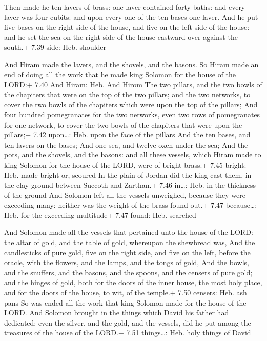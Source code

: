  Then made he ten lavers of brass: one laver contained
forty baths: and every laver was four cubits: and upon every one of the
ten bases one laver.  And he put five bases on the right
side of the house, and five on the left side of the house: and he set
the sea on the right side of the house eastward over against the south.+
7.39 side: Heb. shoulder

 And Hiram made the lavers, and the shovels, and the
basons. So Hiram made an end of doing all the work that he made king
Solomon for the house of the LORD:+ 7.40 And Hiram: Heb. And Hirom
 The two pillars, and the two bowls of the chapiters that
were on the top of the two pillars; and the two networks, to cover the
two bowls of the chapiters which were upon the top of the pillars;
 And four hundred pomegranates for the two networks, even
two rows of pomegranates for one network, to cover the two bowls of the
chapiters that were upon the pillars;+ 7.42 upon\ldots: Heb. upon the
face of the pillars  And the ten bases, and ten lavers on
the bases;  And one sea, and twelve oxen under the sea;
 And the pots, and the shovels, and the basons: and all
these vessels, which Hiram made to king Solomon for the house of the
LORD, were of bright brass.+ 7.45 bright: Heb. made bright or, scoured
 In the plain of Jordan did the king cast them, in the clay
ground between Succoth and Zarthan.+ 7.46 in\ldots: Heb. in the
thickness of the ground  And Solomon left all the vessels
unweighed, because they were exceeding many: neither was the weight of
the brass found out.+ 7.47 because\ldots: Heb. for the exceeding
multitude+ 7.47 found: Heb. searched

 And Solomon made all the vessels that pertained unto the
house of the LORD: the altar of gold, and the table of gold, whereupon
the shewbread was,  And the candlesticks of pure gold, five
on the right side, and five on the left, before the oracle, with the
flowers, and the lamps, and the tongs of gold,  And the
bowls, and the snuffers, and the basons, and the spoons, and the censers
of pure gold; and the hinges of gold, both for the doors of the inner
house, the most holy place, and for the doors of the house, to wit, of
the temple.+ 7.50 censers: Heb. ash pans  So was ended all
the work that king Solomon made for the house of the LORD. And Solomon
brought in the things which David his father had dedicated; even the
silver, and the gold, and the vessels, did he put among the treasures of
the house of the LORD.+ 7.51 things\ldots: Heb. holy things of David


